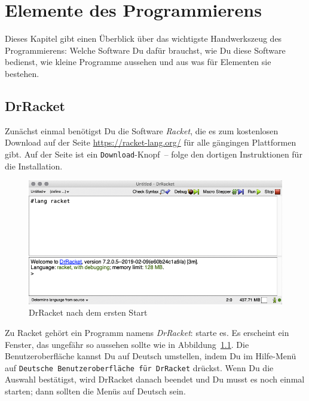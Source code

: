 
\chapter{Elemente des Programmierens}
\label{cha:whats-programming}

Dieses Kapitel gibt einen Überblick über das wichtigste Handwerkszeug
des Programmierens: Welche Software Du dafür brauchst, wie Du diese
Software bedienst, wie kleine Programme aussehen und aus was für
Elementen sie bestehen.

\section{DrRacket}

Zunächst einmal benötigst Du die Software \textit{Racket}, die es zum
kostenlosen Download auf der Seite \url{https://racket-lang.org/} für
alle gängingen Plattformen gibt.  Auf der Seite ist ein
\texttt{Download}-Knopf~-- folge den dortigen Instruktionen für die
Installation.

\begin{figure}[tb]
  \centering
  \includegraphics[width=\textwidth]{i1prog/drracket-start}
  \caption{DrRacket nach dem ersten Start}
  \label{fig:drracket-start}
\end{figure}

Zu Racket gehört ein Programm namens
\textit{DrRacket}: starte es.  Es erscheint ein
Fenster, das ungefähr so aussehen sollte wie in
Abbildung~\ref{fig:drracket-start}.  Die Benutzeroberfläche kannst
Du auf Deutsch umstellen, indem Du im Hilfe-Menü auf \texttt{Deutsche
  Benutzeroberfläche für DrRacket} drückst.  Wenn Du die Auswahl
bestätigst, wird DrRacket danach beendet und Du musst es noch einmal
starten; dann sollten die Menüs auf Deutsch sein.


